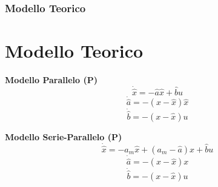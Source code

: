 \documentclass{beamer}
\begin{document}
\begin{frame}
    \frametitle{Modello Teorico}
    \section{Modello Teorico}
    \begin{minipage}{0.45\textwidth}
        \begin{center}
            \textbf{Modello Parallelo (P)}
            \begin{equation*}
                \dot{\hat{x}}=-\hat{a}\hat{x}+\hat{b}u
            \end{equation*}
            \begin{equation*}
                \dot{\hat{a}}=-(x-\hat{x})\hat{x}
            \end{equation*}
            \begin{equation*}
                \dot{\hat{b}}=-(x-\hat{x})u
            \end{equation*}
        \end{center}
    \end{minipage}
    \begin{minipage}{0.45\textwidth}
        \begin{center}
            \textbf{Modello Serie-Parallelo (P)}
            \begin{equation*}
                \dot{\hat{x}}=-a_{m}\hat{x}+(a_{m}-\hat{a})x+\hat{b}u
            \end{equation*}
            \begin{equation*}
                \dot{\hat{a}}=-(x-\hat{x})x
            \end{equation*}
            \begin{equation*}
                \dot{\hat{b}}=-(x-\hat{x})u
            \end{equation*}
        \end{center}
    \end{minipage}
\end{frame}
\end{document}
